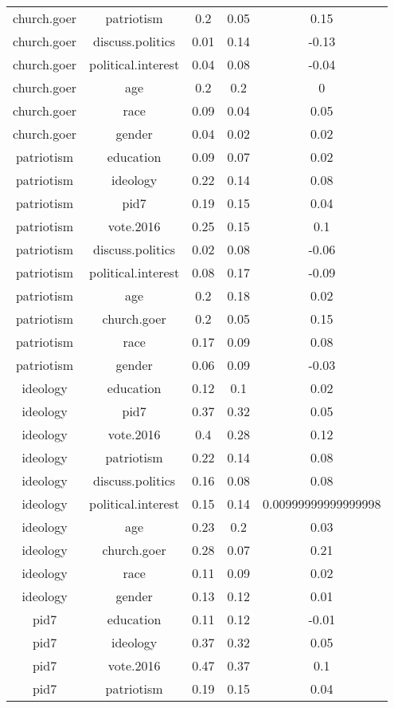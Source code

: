 \begin{longtable}{@{\extracolsep{5pt}} ccccc}
church.goer & patriotism & 0.2 & 0.05 & 0.15 \\ 
church.goer & discuss.politics & 0.01 & 0.14 & -0.13 \\ 
church.goer & political.interest & 0.04 & 0.08 & -0.04 \\ 
church.goer & age & 0.2 & 0.2 & 0 \\ 
church.goer & race & 0.09 & 0.04 & 0.05 \\ 
church.goer & gender & 0.04 & 0.02 & 0.02 \\ 
patriotism & education & 0.09 & 0.07 & 0.02 \\ 
patriotism & ideology & 0.22 & 0.14 & 0.08 \\ 
patriotism & pid7 & 0.19 & 0.15 & 0.04 \\ 
patriotism & vote.2016 & 0.25 & 0.15 & 0.1 \\ 
patriotism & discuss.politics & 0.02 & 0.08 & -0.06 \\ 
patriotism & political.interest & 0.08 & 0.17 & -0.09 \\ 
patriotism & age & 0.2 & 0.18 & 0.02 \\ 
patriotism & church.goer & 0.2 & 0.05 & 0.15 \\ 
patriotism & race & 0.17 & 0.09 & 0.08 \\ 
patriotism & gender & 0.06 & 0.09 & -0.03 \\ 
ideology & education & 0.12 & 0.1 & 0.02 \\ 
ideology & pid7 & 0.37 & 0.32 & 0.05 \\ 
ideology & vote.2016 & 0.4 & 0.28 & 0.12 \\ 
ideology & patriotism & 0.22 & 0.14 & 0.08 \\ 
ideology & discuss.politics & 0.16 & 0.08 & 0.08 \\ 
ideology & political.interest & 0.15 & 0.14 & 0.00999999999999998 \\ 
ideology & age & 0.23 & 0.2 & 0.03 \\ 
ideology & church.goer & 0.28 & 0.07 & 0.21 \\ 
ideology & race & 0.11 & 0.09 & 0.02 \\ 
ideology & gender & 0.13 & 0.12 & 0.01 \\ 
pid7 & education & 0.11 & 0.12 & -0.01 \\ 
pid7 & ideology & 0.37 & 0.32 & 0.05 \\ 
pid7 & vote.2016 & 0.47 & 0.37 & 0.1 \\ 
pid7 & patriotism & 0.19 & 0.15 & 0.04 \\ 

\end{longtable}
